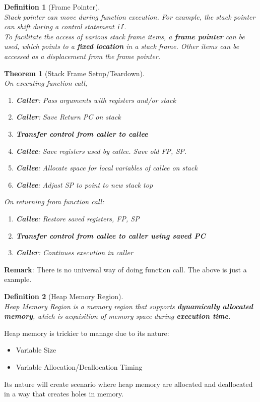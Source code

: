 \documentclass[12pt]{article}
\newtheorem{definition}{Definition}[section]
\newtheorem{theorem}{Theorem}[section]
\theoremstyle{definition}
\begin{document}
\begin{definition}[Frame Pointer]
\hfill\\\normalfont Stack pointer can move during function execution. For example, the stack pointer can shift during a control statement \texttt{if}.\\
To facilitate the access of various stack frame items, a \textbf{frame pointer} can be used, which points to a \textbf{fixed location} in a stack frame. Other items can be accessed as a displacement from the frame pointer.
\end{definition}
\begin{theorem}[Stack Frame Setup/Teardown]
\hfill\\\normalfont On executing function call,
\begin{enumerate}
  \item \textbf{Caller}: Pass arguments with registers and/or stack
  \item \textbf{Caller}: Save Return PC on stack
  \item \textbf{Transfer control from caller to callee}
  \item \textbf{Callee}: Save registers used by callee. Save old FP, SP.
  \item \textbf{Callee}: Allocate space for local variables of callee on stack
  \item \textbf{Callee}: Adjust SP to point to new stack top
\end{enumerate}
On returning from function call:
\begin{enumerate}
  \item \textbf{Callee}: Restore saved registers, FP, SP
  \item \textbf{Transfer control from callee to caller using saved PC}
  \item \textbf{Caller}: Continues execution in caller
\end{enumerate}
\end{theorem}
\textbf{Remark}: There is no universal way of doing function call. The above is just a example.
\begin{definition}[Heap Memory Region]
\hfill\\\normalfont Heap Memory Region is a memory region that supports \textbf{dynamically allocated memory}, which is acquisition of memory space during \textbf{execution time}.
\end{definition}
Heap memory is trickier to manage due to its nature:
\begin{itemize}
  \item Variable Size
  \item Variable Allocation/Deallocation Timing
\end{itemize}
Its nature will create scenario where heap memory are allocated and deallocated in a way that creates holes in memory.\\
\end{document}
